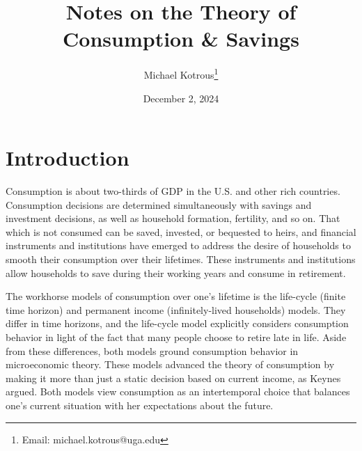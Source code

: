 \documentclass[11pt]{article}
\title{Notes on the Theory of Consumption \& Savings}
\author[1]{Michael Kotrous\thanks{Email: michael.kotrous@uga.edu}}
\affil[1]{John Munro Godfrey, Sr. Department of Economics\\University of Georgia}
\date{December 2, 2024}
\begin{document}
\symbolfootnotes
\maketitle
\setcounter{page}{1}
\setcounter{footnote}{0}
\arabicfootnotes

\section{Introduction}
Consumption is about two-thirds of GDP in the U.S. and other rich countries. Consumption decisions are determined simultaneously with savings and investment decisions, as well as household formation, fertility, and so on. That which is not consumed can be saved, invested, or bequested to heirs, and financial instruments and institutions have emerged to address the desire of households to smooth their consumption over their lifetimes. These instruments and institutions allow households to save during their working years and consume in retirement.

The workhorse models of consumption over one's lifetime is the life-cycle (finite time horizon) and permanent income (infinitely-lived households) models. They differ in time horizons, and the life-cycle model explicitly considers consumption behavior in light of the fact that many people choose to retire late in life. Aside from these differences, both models ground consumption behavior in microeconomic theory. These models advanced the theory of consumption by making it more than just a static decision based on current income, as Keynes argued. Both models view consumption as an intertemporal choice that balances one's current situation with her expectations about the future.
\end{document}

